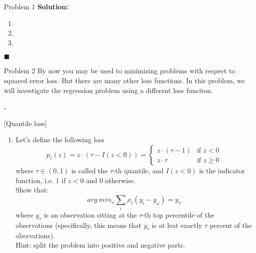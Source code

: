 \documentclass{article}
\newcounter{pcounter}                                   %
\newenvironment{problem}                                %
{                                                       %
    \color{gray}                                        %
    \stepcounter{pcounter}                              %
    \textbf{\arabic{pcounter}.}                         %
}{}                                                     %
\newenvironment{solution}                               %
{\textbf{Solution:} }{$\blacksquare$}                   %
\newcommand{\IdenMat}{\textit{I}}                       %
\begin{document}
\begin{section}{Problem 1}
        \begin{solution}
            \begin{enumerate}[label=\alph*)]
                \item %
                
                \item %
                
                \item %
                
            \end{enumerate}
        \end{solution}
    \end{section}

    \begin{section}{Problem 2}
        \setcounter{pcounter}{0}
        By now you may be used to minimizing problems with respect to squared error loss. But there are many other loss functions. In this problem, we will investigate the regression problem using a different loss funciton.

        \begin{problem}
            [Quantile loss]\\
            \begin{enumerate}[label=(\alph*)]
                \item Let's define the following loss
                $$
                    p_{\tau}(z) = z \cdot (\tau - \IdenMat(z < 0)) = 
                    \begin{cases}
                        z \cdot (\tau - 1) & \text{if $z < 0$} \\
                        z \cdot \tau & \text{if $z \geq 0$}
                    \end{cases}
                $$
                where $\tau \in (0,1)$ is called the $\tau$-th quantile, and $\IdenMat(z < 0)$ is the indicator function, i.e. $1$ if $z < 0$ and $0$ otherwise.
                \\
                Show that:
                $$
                    arg\ min_{\omega} \sum_{i} \rho_\tau (y_i - y_{\omega}) = y_{\tau}
                $$
                where $y_{\tau}$ is an observation sitting at the $\tau$-th top percentile of the observations (specifically, this means that $y_{\tau}$ is at leat exactly $\tau$ percent of the obervations).
                \\
                Hint: split the problem into positive and negative parts.


\end{enumerate}
\end{problem}
\end{section}
\end{document}

